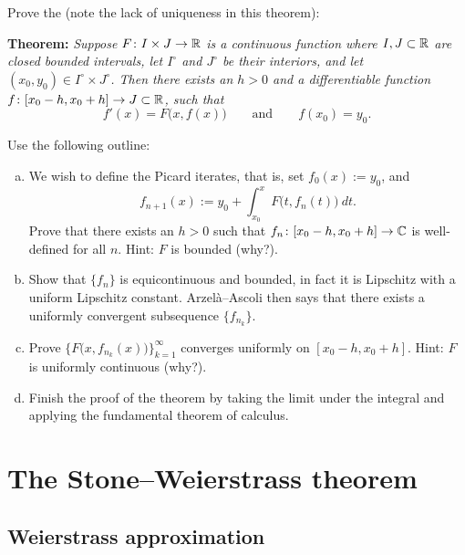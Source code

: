 \begin{exercise} \label{exercise:peanoexistence}
Prove the \emph{} (note the lack of
uniqueness in this theorem):

\textbf{Theorem:} \emph{Suppose $F \colon I \times J \to {\mathbb{R}}$ is 
a continuous function where
$I, J \subset {\mathbb{R}}$ are closed bounded intervals, 
let $I^\circ$ and $J^\circ$ be their interiors,
and
let $(x_0,y_0) \in I^\circ \times J^\circ$.
Then there exists an $h > 0$ and a differentiable
function $f \colon [x_0 - h, x_0 + h] \to J \subset {\mathbb{R}}$, such that}
\begin{equation*}
f'(x) = F\bigl(x,f(x)\bigr) \qquad \text{and} \qquad f(x_0) = y_0.
\end{equation*}

Use the following outline:
\begin{enumerate}[a)]
\item
We wish to define the Picard iterates, that is,
set $f_0(x) := y_0$, and 
\begin{equation*}
f_{n+1}(x) := y_0 + \int_{x_0}^x F\bigl(t,f_n(t)\bigr)~dt .
\end{equation*}
Prove that there exists an $h > 0$ such that
$f_n \colon [x_0 - h, x_0 + h] \to {\mathbb{C}}$ is well-defined
for all $n$.  Hint: $F$ is bounded (why?).
\item
Show that $\{ f_n \}$ is equicontinuous and bounded, in fact it is
Lipschitz with a uniform Lipschitz constant.  Arzel\`a--Ascoli
then says that there exists a
uniformly convergent subsequence $\{ f_{n_k} \}$.
\item
Prove 
$\bigl\{ F\bigl(x,f_{n_k}(x)\bigr) \bigr\}_{k=1}^\infty$ converges uniformly
on $[x_0-h,x_0+h]$.
Hint: $F$ is uniformly continuous (why?).
\item
Finish the proof of the theorem by taking the limit under the integral
and applying the fundamental theorem of calculus.
\end{enumerate}
\end{exercise}


\sectionnewpage
\section{The Stone--Weierstrass theorem}
\label{sec:stoneweier}


\subsection{Weierstrass approximation}


